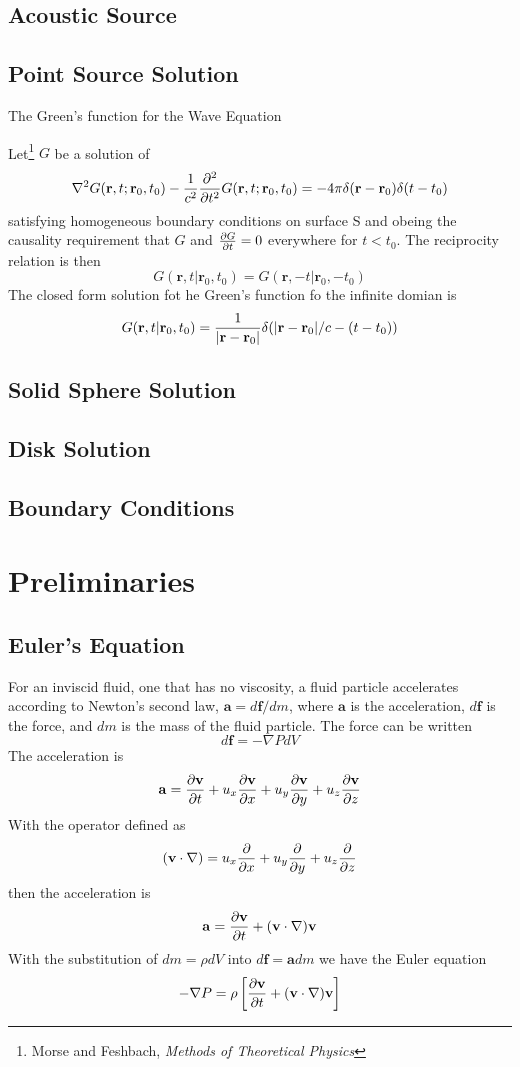 ﻿\documentclass{article}
\begin{document}
\subsection{Acoustic Source}
\subsection{Point Source Solution}
The Green's function for the Wave Equation

Let\footnote{Morse and Feshbach, \textit{Methods of Theoretical Physics}}
$G$ be a solution of
$$
\nabla^2G(\mathbf{r},t; \mathbf{r}_0,t_0)-{1\over c^2}{\partial^2\over\partial t^2}G(\mathbf{r},t; \mathbf{r}_0,t_0)= -4\pi\delta(\mathbf{r}-\mathbf{r}_0)\delta(t-t_0)
$$
satisfying homogeneous boundary conditions on surface S and obeing the causality requirement that $G$ and 
${\partial G\over\partial t}=0$ everywhere for $t<t_0$.  The reciprocity relation is
then
$$
G(\mathbf{r},t\vert\mathbf{r}_0,t_0) = G(\mathbf{r},-t\vert\mathbf{r}_0,-t_0)
$$
The closed form solution fot he Green's function fo the infinite domian is
$$
G(\mathbf{r},t\vert\mathbf{r}_0,t_0) = {1\over \vert\mathbf{r}-\mathbf{r}_0\vert}\delta(\vert\mathbf{r}-\mathbf{r}_0\vert/c - (t-t_0))
$$

\subsection{Solid Sphere Solution}
\subsection{Disk Solution}
\subsection{Boundary Conditions}

\section{Preliminaries}
\subsection{Euler's Equation}
For an inviscid fluid, one that has no viscosity, a fluid particle
accelerates according to Newton's second law,
$\mathbf{a}=d\mathbf{f}/dm$, where $\mathbf{a}$ is the acceleration,
$d\mathbf{f}$ is the force, and $dm$ is the mass of the fluid particle. 
The force can be written
$$
d\mathbf{f}=-\nabla P dV
$$
The acceleration is
$$
\mathbf{a}={\partial \mathbf{v}\over \partial t} + u_x{\partial \mathbf{v}\over \partial x} + u_y\frac{\partial
\mathbf{v}}{\partial y} + u_z{\partial \mathbf{v}\over \partial z}
$$
With the operator defined as
$$
(\mathbf{v} \cdot \nabla) = u_x{\partial\over \partial x} + u_y{\partial\over \partial y} +
u_z{\partial\over \partial z}
$$
then the acceleration is
$$
\mathbf{a}={\partial \mathbf{v}\over \partial t} + (\mathbf{v} \cdot \nabla)\mathbf{v}
$$
With the substitution of $dm=\rho dV$ into $d\mathbf{f}=\mathbf{a} dm$ we have the Euler equation
$$
-\nabla P = \rho \left [ {\partial \mathbf{v}\over \partial t} + (\mathbf{v} \cdot \nabla)\mathbf{v} \right ]
$$
\end{document}
